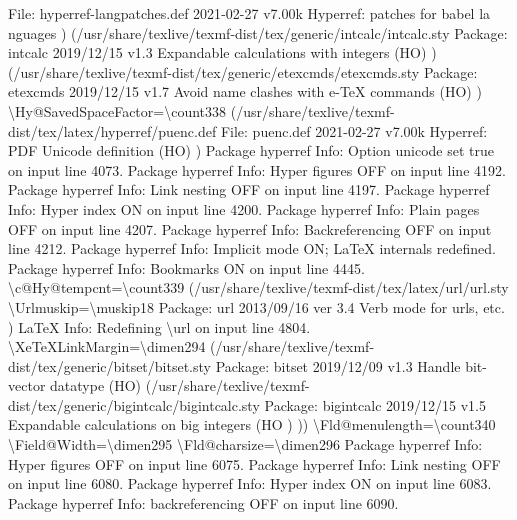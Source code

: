 \documentclass[
  letterpaper,
  DIV=11,
  numbers=noendperiod]{scrartcl}
\newenvironment{Shaded}{\begin{snugshade}}{\end{snugshade}}
\newcommand{\NormalTok}[1]{\textcolor[rgb]{0.00,0.23,0.31}{#1}}
\begin{document}
\begin{Shaded}
\begin{Highlighting}[]
\NormalTok{File: hyperref{-}langpatches.def 2021{-}02{-}27 v7.00k Hyperref: patches for babel la}
\NormalTok{nguages}
\NormalTok{) (/usr/share/texlive/texmf{-}dist/tex/generic/intcalc/intcalc.sty}
\NormalTok{Package: intcalc 2019/12/15 v1.3 Expandable calculations with integers (HO)}
\NormalTok{) (/usr/share/texlive/texmf{-}dist/tex/generic/etexcmds/etexcmds.sty}
\NormalTok{Package: etexcmds 2019/12/15 v1.7 Avoid name clashes with e{-}TeX commands (HO)}
\NormalTok{)}
\NormalTok{\textbackslash{}Hy@SavedSpaceFactor=\textbackslash{}count338}
\NormalTok{(/usr/share/texlive/texmf{-}dist/tex/latex/hyperref/puenc.def}
\NormalTok{File: puenc.def 2021{-}02{-}27 v7.00k Hyperref: PDF Unicode definition (HO)}
\NormalTok{)}
\NormalTok{Package hyperref Info: Option \textasciigrave{}unicode\textquotesingle{} set \textasciigrave{}true\textquotesingle{} on input line 4073.}
\NormalTok{Package hyperref Info: Hyper figures OFF on input line 4192.}
\NormalTok{Package hyperref Info: Link nesting OFF on input line 4197.}
\NormalTok{Package hyperref Info: Hyper index ON on input line 4200.}
\NormalTok{Package hyperref Info: Plain pages OFF on input line 4207.}
\NormalTok{Package hyperref Info: Backreferencing OFF on input line 4212.}
\NormalTok{Package hyperref Info: Implicit mode ON; LaTeX internals redefined.}
\NormalTok{Package hyperref Info: Bookmarks ON on input line 4445.}
\NormalTok{\textbackslash{}c@Hy@tempcnt=\textbackslash{}count339}
\NormalTok{(/usr/share/texlive/texmf{-}dist/tex/latex/url/url.sty}
\NormalTok{\textbackslash{}Urlmuskip=\textbackslash{}muskip18}
\NormalTok{Package: url 2013/09/16  ver 3.4  Verb mode for urls, etc.}
\NormalTok{)}
\NormalTok{LaTeX Info: Redefining \textbackslash{}url on input line 4804.}
\NormalTok{\textbackslash{}XeTeXLinkMargin=\textbackslash{}dimen294}
\NormalTok{(/usr/share/texlive/texmf{-}dist/tex/generic/bitset/bitset.sty}
\NormalTok{Package: bitset 2019/12/09 v1.3 Handle bit{-}vector datatype (HO)}
\NormalTok{(/usr/share/texlive/texmf{-}dist/tex/generic/bigintcalc/bigintcalc.sty}
\NormalTok{Package: bigintcalc 2019/12/15 v1.5 Expandable calculations on big integers (HO}
\NormalTok{)}
\NormalTok{))}
\NormalTok{\textbackslash{}Fld@menulength=\textbackslash{}count340}
\NormalTok{\textbackslash{}Field@Width=\textbackslash{}dimen295}
\NormalTok{\textbackslash{}Fld@charsize=\textbackslash{}dimen296}
\NormalTok{Package hyperref Info: Hyper figures OFF on input line 6075.}
\NormalTok{Package hyperref Info: Link nesting OFF on input line 6080.}
\NormalTok{Package hyperref Info: Hyper index ON on input line 6083.}
\NormalTok{Package hyperref Info: backreferencing OFF on input line 6090.}

\end{Highlighting}
\end{Shaded}
\end{document}
